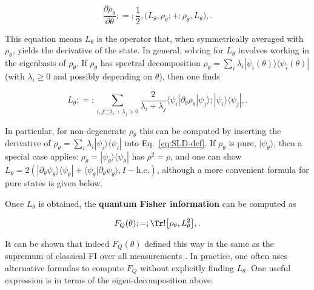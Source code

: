 \begin{equation}

\frac{\partial \rho_\theta}{\partial \theta} ;=; \frac{1}{2},\big( L_\theta,\rho_\theta ;+; \rho_\theta,L_\theta \big) ,.

\label{eq:SLD-def}

\end{equation}

This equation means $L_\theta$ is the operator that, when symmetrically averaged with $\rho_\theta$, yields the derivative of the state. In general, solving for $L_\theta$ involves working in the eigenbasis of $\rho_\theta$. If $\rho_\theta$ has spectral decomposition $\rho_\theta = \sum_i \lambda_i |\psi_i(\theta)\rangle\langle \psi_i(\theta)|$ (with $\lambda_i\ge0$ and possibly depending on $\theta$), then one finds

\begin{equation}

L_\theta ;=; \sum_{i,j:;\lambda_i + \lambda_j > 0} \frac{2}{\lambda_i + \lambda_j} \langle \psi_i|\partial_\theta \rho_\theta|\psi_j \rangle ;|\psi_i\rangle\langle \psi_j| ,.

\label{eq:SLD-eigenbasis}

\end{equation}

In particular, for non-degenerate $\rho_\theta$ this can be computed by inserting the derivative of $\rho_\theta = \sum_i \lambda_i |\psi_i\rangle\langle\psi_i|$ into Eq.~\eqref{eq:SLD-def}. If $\rho_\theta$ is pure, $|\psi_\theta\rangle$, then a special case applies: $\rho_\theta = |\psi_\theta\rangle\langle\psi_\theta|$ has $\rho^2=\rho$, and one can show $L_\theta = 2(|\partial_\theta \psi_\theta\rangle\langle \psi_\theta| + \langle \psi_\theta|\partial_\theta \psi_\theta\rangle, I - \text{h.c.})$, although a more convenient formula for pure states is given below.



Once $L_\theta$ is obtained, the \textbf{quantum Fisher information} can be computed as

\begin{equation}

F_Q(\theta) ;=; \Tr!\big[\rho_\theta, L_\theta^2\big] ,.

\label{eq:QFI-def}

\end{equation}

It can be shown that indeed $F_Q(\theta)$ defined this way is the same as the supremum of classical FI over all measurements \cite{Helstrom1976, Holevo2011, BraunsteinCaves1994}. In practice, one often uses alternative formulas to compute $F_Q$ without explicitly finding $L_\theta$. One useful expression is in terms of the eigen-decomposition above:

